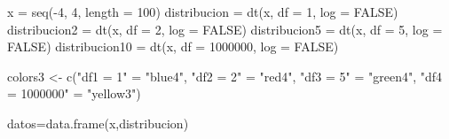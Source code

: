 \documentclass[
]{article}
\newenvironment{Shaded}{\begin{snugshade}}{\end{snugshade}}
\newcommand{\AttributeTok}[1]{\textcolor[rgb]{0.77,0.63,0.00}{#1}}
\newcommand{\ConstantTok}[1]{\textcolor[rgb]{0.00,0.00,0.00}{#1}}
\newcommand{\DecValTok}[1]{\textcolor[rgb]{0.00,0.00,0.81}{#1}}
\newcommand{\FunctionTok}[1]{\textcolor[rgb]{0.00,0.00,0.00}{#1}}
\newcommand{\NormalTok}[1]{#1}
\newcommand{\OtherTok}[1]{\textcolor[rgb]{0.56,0.35,0.01}{#1}}
\newcommand{\SpecialCharTok}[1]{\textcolor[rgb]{0.00,0.00,0.00}{#1}}
\newcommand{\StringTok}[1]{\textcolor[rgb]{0.31,0.60,0.02}{#1}}
\begin{document}
\begin{Shaded}
\begin{Highlighting}[]
\NormalTok{x }\OtherTok{=} \FunctionTok{seq}\NormalTok{(}\SpecialCharTok{{-}}\DecValTok{4}\NormalTok{, }\DecValTok{4}\NormalTok{, }\AttributeTok{length =} \DecValTok{100}\NormalTok{)}
\NormalTok{distribucion }\OtherTok{=} \FunctionTok{dt}\NormalTok{(x, }\AttributeTok{df =} \DecValTok{1}\NormalTok{, }\AttributeTok{log =} \ConstantTok{FALSE}\NormalTok{)}
\NormalTok{distribucion2 }\OtherTok{=} \FunctionTok{dt}\NormalTok{(x, }\AttributeTok{df =} \DecValTok{2}\NormalTok{, }\AttributeTok{log =} \ConstantTok{FALSE}\NormalTok{)}
\NormalTok{distribucion5 }\OtherTok{=} \FunctionTok{dt}\NormalTok{(x, }\AttributeTok{df =} \DecValTok{5}\NormalTok{, }\AttributeTok{log =} \ConstantTok{FALSE}\NormalTok{)}
\NormalTok{distribucion10 }\OtherTok{=} \FunctionTok{dt}\NormalTok{(x, }\AttributeTok{df =} \DecValTok{1000000}\NormalTok{, }\AttributeTok{log =} \ConstantTok{FALSE}\NormalTok{)}

\NormalTok{colors3 }\OtherTok{\textless{}{-}} \FunctionTok{c}\NormalTok{(}\StringTok{"df1 = 1"} \OtherTok{=} \StringTok{"blue4"}\NormalTok{, }\StringTok{"df2 = 2"} \OtherTok{=} \StringTok{"red4"}\NormalTok{, }\StringTok{"df3 = 5"} \OtherTok{=} \StringTok{"green4"}\NormalTok{, }\StringTok{"df4 = 1000000"} \OtherTok{=} \StringTok{"yellow3"}\NormalTok{)}

\NormalTok{datos}\OtherTok{=}\FunctionTok{data.frame}\NormalTok{(x,distribucion)}


\end{Highlighting}
\end{Shaded}
\end{document}
